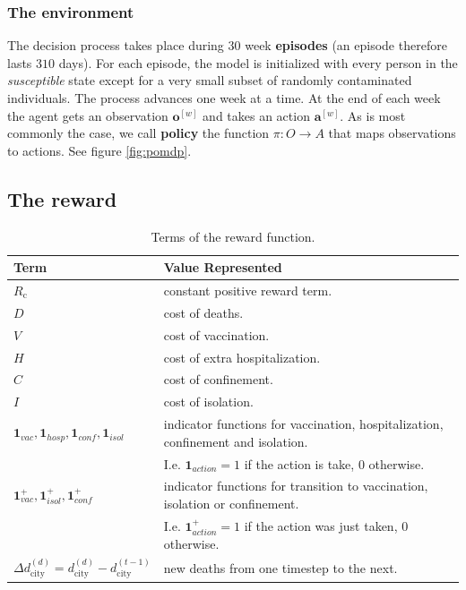 \documentclass[10pt]{article}
\begin{document}
\subsubsection*{The environment}

The decision process takes place during $30$ week \textbf{episodes} (an episode therefore lasts $310$ days).
For each episode, the model is initialized with every person in the \textit{susceptible} state except for a very small subset of randomly contaminated individuals. The process advances one week at a time. At the end of each week the agent gets an observation $\mathbf{o}^{[w]}$ and takes an action $\mathbf{a}^{[w]}$. As is most commonly the case, we call \textbf{policy} the function $\pi : O \rightarrow A$ that maps observations to actions. See figure \ref{fig:pomdp}.


\subsection*{The reward}

\begin{table}[ht]
  \begin{center}
    \begin{tabular}{||l | l ||} 
     \hline
     Term & Value Represented  \\ [0.5ex] 
     \hline\hline
     $R_\text{c}$ & constant positive reward term.  \\ 
     \hline
     $D$ & cost of deaths. \\ 
     \hline
     $V$ & cost of vaccination. \\ 
     \hline
     $H$ & cost of extra hospitalization. \\ 
     \hline
     $C$ & cost of confinement. \\ 
     \hline
     $I$ & cost of isolation.  \\ 
     \hline
     $ \mathbf{1}_{vac} ,\mathbf{1}_{hosp},\mathbf{1}_{conf},\mathbf{1}_{isol}$ & indicator functions for vaccination, hospitalization, confinement and isolation.  \\ 
      & I.e.  $\mathbf{1}_{action} = 1$ if the action is take, $0$ otherwise. \\ 
     \hline
     $ \mathbf{1}_{vac}^+,\mathbf{1}_{isol}^+,\mathbf{1}_{conf}^+$ & indicator functions for transition to vaccination, isolation or confinement.  \\ 
     & I.e.  $\mathbf{1}_{action}^+ = 1$ if the action was just taken, $0$ otherwise. \\ 
     \hline
     $\Delta d_\text{city}^{(d)} =  d_\text{city}^{(d)} -  d_\text{city}^{(t-1)}$ & new deaths from one timestep to the next.  \\ 
     \hline
    \end{tabular}
    \end{center}
    \caption{Terms of the reward function.}
    \label{table:reward}
\end{table}
\end{document}
